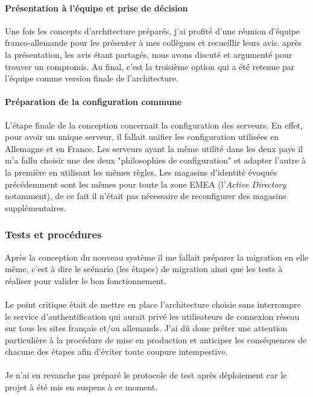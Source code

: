 \documentclass[a4paper,12pt]{report}
\begin{document}
\paragraph*{Présentation à l'équipe et prise de décision}
Une fois les concepts d'architecture préparés, j'ai profité d'une réunion d'équipe franco-allemande pour les présenter à mes collègues et recueillir leurs avis. après la présentation, les avis étant partagés, nous avons discuté et argumenté pour trouver un compromis. Au final, c'est la troisième option qui a été retenue par l'équipe comme version finale de l'architecture.

\paragraph*{Préparation de la configuration commune}
L'étape finale de la conception concernait la configuration des serveurs. En effet, pour avoir un unique serveur, il fallait unifier les configuration utilisées en Allemagne et en France. Les serveurs ayant la même utilité dans les deux pays il m'a fallu choisir une des deux "philosophies de configuration" et adapter l'autre à la première en utilisant les mêmes règles. Les magasins d'identité évoqués précédemment sont les mêmes pour toute la zone EMEA (l'\textit{Active Directory} notamment), de ce fait il n'était pas nécessaire de reconfigurer des magasins supplémentaires.

\subsubsection{Tests et procédures}
Après la conception du nouveau système il me fallait préparer la migration en elle même, c'est à dire le scénario (les étapes) de migration ainsi que les tests à réaliser pour valider le bon fonctionnement.
\paragraph{}
Le point critique était de mettre en place l'architecture choisie sans interrompre le service d'authentification qui aurait privé les utilisateurs de connexion réseau sur tous les sites français et/ou allemands. J'ai dû donc prêter une attention particulière à la procédure de mise en production et anticiper les conséquences de chacune des étapes afin d'éviter toute coupure intempestive.
\paragraph{}
Je n'ai en revanche pas préparé le protocole de test après déploiement car le projet à été mis en suspens à ce moment.
\end{document}
